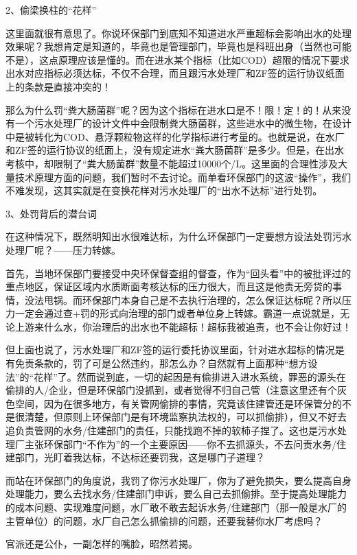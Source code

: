 \documentclass[]{book}
\begin{document}
2、偷梁换柱的``花样''

这里面就很有意思了。你说环保部门到底知不知道进水严重超标会影响出水的处理效果呢？我想肯定是知道的，毕竟也是管理部门，毕竟也是科班出身（当然也可能不是），这点原理应该是懂的。而在进水某个指标（比如COD）超限的情况下要求出水对应指标必须达标，不仅不合理，而且跟污水处理厂和ZF签的运行协议纸面上的条款是直接冲突的！

那么为什么罚``粪大肠菌群''呢？因为这个指标在进水口是不！限！定！的！从来没有一个污水处理厂的设计文件中会限制粪大肠菌群，这些进水中的微生物，在设计中是被转化为COD、悬浮颗粒物这样的化学指标进行考量的。也就是说，在水厂和ZF签的运行协议的纸面上，没有规定进水``粪大肠菌群''是多少。但是，在出水考核中，却限制了``粪大肠菌群''数量不能超过10000个/L。这里面的合理性涉及大量技术原理方面的问题，我们暂时不去讨论。而单看环保部门的这波``操作''，我们不难发现，这其实就是在变换花样对污水处理厂的``出水不达标''进行处罚。

3、处罚背后的潜台词

在这种情况下，既然明知出水很难达标，为什么环保部门一定要想方设法处罚污水处理厂呢？------压力转嫁。

首先，当地环保部门要接受中央环保督查组的督查，作为``回头看''中的被批评过的重点地区，保证区域内水质断面考核达标的压力很大，而且这是他责无旁贷的事情，没法甩锅。而环保部门本身自己是不去执行治理的，怎么保证达标呢？所以压力一定会通过查+罚的形式向治理的部门或者单位身上转嫁。霸道一点说就是，无论上游来什么水，你治理后的出水也不能超标！超标我被追责，也不会让你好过！

但上面也说了，污水处理厂和ZF签的运行委托协议里面，针对进水超标的情况是有免责条款的，罚了可是公然违约，那怎么办？自然就有上面那种``想方设法''的``花样''了。然而说到底，一切的起因是有偷排进入进水系统，罪恶的源头在偷排的人/企业，但是环保部门没抓到，或者觉得不归自己管（注意这里还有个灰色空间，因为在很多地方，有关管网偷排的事情，究竟该住建管还是环保管分的不是很清楚，但原则上环保部门是有环境监察执法权的，可以抓偷排），但又不好去追负责管网的水务/住建部门的责任，只能找跑不掉的软柿子捏了。这也是污水处理厂主张环保部门``不作为''的一个主要原因------你不去抓源头，不去问责水务/住建部门，光盯着我达标，不达标还要罚我，这是哪门子道理？

而站在环保部门的角度说，我罚了你污水处理厂，你为了避免损失，要么提高自身处理能力，要么去找水务/住建部门申诉，要么自己去抓偷排。至于提高处理能力的成本问题、实现难度问题，水厂敢不敢去起诉水务/住建部门（那一般是水厂的主管单位）的问题，水厂自己怎么抓偷排的问题，还要我替你水厂考虑吗？

官派还是公仆，一副怎样的嘴脸，昭然若揭。
\end{document}
